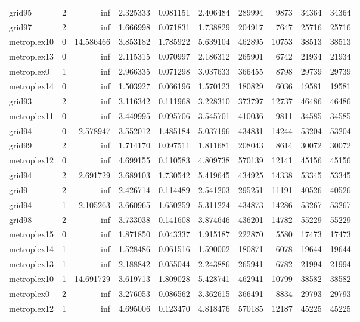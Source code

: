 \documentclass[../../../thesis.tex]{subfiles}
\begin{document}
\begin{longtable}{|l|r|r|r|r|r|r|r|r|r|}
grid95 & 2 & inf & 2.325333 & 0.081151 & 2.406484 & 289994 & 9873 & 34364 & 34364 \\
grid97 & 2 & inf & 1.666998 & 0.071831 & 1.738829 & 204917 & 7647 & 25716 & 25716 \\
metroplex10 & 0 & 14.586466 & 3.853182 & 1.785922 & 5.639104 & 462895 & 10753 & 38513 & 38513 \\
metroplex13 & 0 & inf & 2.115315 & 0.070997 & 2.186312 & 265901 & 6742 & 21934 & 21934 \\
metroplex0 & 1 & inf & 2.966335 & 0.071298 & 3.037633 & 366455 & 8798 & 29739 & 29739 \\
metroplex14 & 0 & inf & 1.503927 & 0.066196 & 1.570123 & 180829 & 6036 & 19581 & 19581 \\
grid93 & 2 & inf & 3.116342 & 0.111968 & 3.228310 & 373797 & 12737 & 46486 & 46486 \\
metroplex11 & 0 & inf & 3.449995 & 0.095706 & 3.545701 & 410036 & 9811 & 34585 & 34585 \\
grid94 & 0 & 2.578947 & 3.552012 & 1.485184 & 5.037196 & 434831 & 14244 & 53204 & 53204 \\
grid99 & 2 & inf & 1.714170 & 0.097511 & 1.811681 & 208043 & 8614 & 30072 & 30072 \\
metroplex12 & 0 & inf & 4.699155 & 0.110583 & 4.809738 & 570139 & 12141 & 45156 & 45156 \\
grid94 & 2 & 2.691729 & 3.689103 & 1.730542 & 5.419645 & 434925 & 14338 & 53345 & 53345 \\
grid9 & 2 & inf & 2.426714 & 0.114489 & 2.541203 & 295251 & 11191 & 40526 & 40526 \\
grid94 & 1 & 2.105263 & 3.660965 & 1.650259 & 5.311224 & 434873 & 14286 & 53267 & 53267 \\
grid98 & 2 & inf & 3.733038 & 0.141608 & 3.874646 & 436201 & 14782 & 55229 & 55229 \\
metroplex15 & 0 & inf & 1.871850 & 0.043337 & 1.915187 & 222870 & 5580 & 17473 & 17473 \\
metroplex14 & 1 & inf & 1.528486 & 0.061516 & 1.590002 & 180871 & 6078 & 19644 & 19644 \\
metroplex13 & 1 & inf & 2.188842 & 0.055044 & 2.243886 & 265941 & 6782 & 21994 & 21994 \\
metroplex10 & 1 & 14.691729 & 3.619713 & 1.809028 & 5.428741 & 462941 & 10799 & 38582 & 38582 \\
metroplex0 & 2 & inf & 3.276053 & 0.086562 & 3.362615 & 366491 & 8834 & 29793 & 29793 \\
metroplex12 & 1 & inf & 4.695006 & 0.123470 & 4.818476 & 570185 & 12187 & 45225 & 45225 \\

\end{longtable}
\end{document}
